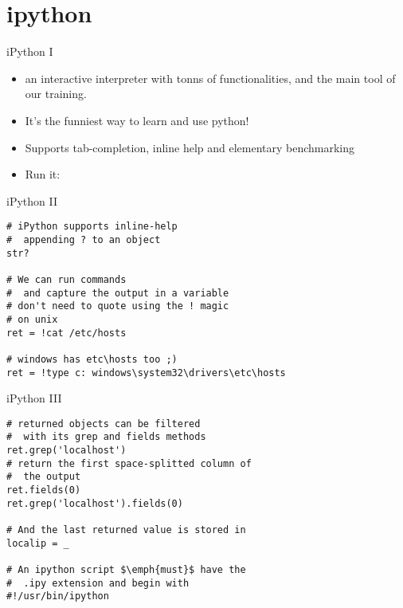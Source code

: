 \section{ipython}



\begin{frame}{iPython I}
\begin{itemize}
\item an interactive interpreter with tonns of                                                                                                        functionalities, and the main tool of our training.                                                                                                      

\item   It's the funniest way to learn and use python!

\item   Supports tab-completion, inline help and elementary
    benchmarking

\item   Run it: \\
\end{itemize}

\end{frame}


\begin{frame}[fragile]{iPython II}
\begin{verbatim}
# iPython supports inline-help
#  appending ? to an object
str?

# We can run commands
#  and capture the output in a variable
# don't need to quote using the ! magic
# on unix
ret = !cat /etc/hosts

# windows has etc\hosts too ;)
ret = !type c: windows\system32\drivers\etc\hosts
\end{verbatim}
\end{frame}


\begin{frame}[fragile]{iPython III}
\begin{verbatim}
# returned objects can be filtered
#  with its grep and fields methods
ret.grep('localhost')
# return the first space-splitted column of
#  the output
ret.fields(0)
ret.grep('localhost').fields(0)

# And the last returned value is stored in 
localip = _

# An ipython script $\emph{must}$ have the 
#  .ipy extension and begin with
#!/usr/bin/ipython 
\end{verbatim}
\end{frame}

